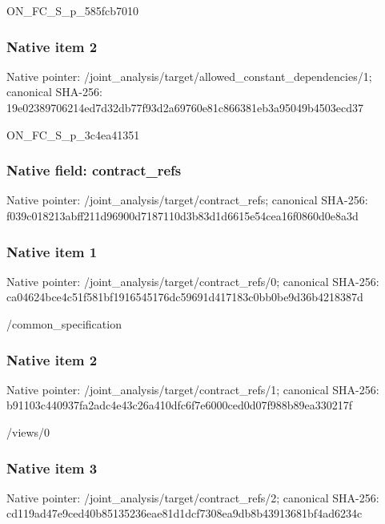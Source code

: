 \documentclass[10pt,a4paper]{article}
\begin{document}
\begingroup\raggedright\sloppy ON\_\allowbreak{}FC\_\allowbreak{}S\_\allowbreak{}p\_\allowbreak{}585fcb7010\par\endgroup

\subsubsection{Native item 2}
Native pointer: /joint\_\allowbreak{}analysis/target/allowed\_\allowbreak{}constant\_\allowbreak{}dependencies/1; canonical SHA-256: 19e02389706214ed7d32db77f93d2a69760e81c866381eb3a95049b4503ecd37

\begingroup\raggedright\sloppy ON\_\allowbreak{}FC\_\allowbreak{}S\_\allowbreak{}p\_\allowbreak{}3c4ea41351\par\endgroup

\subsubsection{Native field: contract\_\allowbreak{}refs}
Native pointer: /joint\_\allowbreak{}analysis/target/contract\_\allowbreak{}refs; canonical SHA-256: f039c018213abff211d96900d7187110d3b83d1d6615e54cea16f0860d0e8a3d

\subsubsection{Native item 1}
Native pointer: /joint\_\allowbreak{}analysis/target/contract\_\allowbreak{}refs/0; canonical SHA-256: ca04624bce4c51f581bf1916545176dc59691d417183c0bb0be9d36b4218387d

\begingroup\raggedright\sloppy /\allowbreak{}common\_\allowbreak{}specification\par\endgroup

\subsubsection{Native item 2}
Native pointer: /joint\_\allowbreak{}analysis/target/contract\_\allowbreak{}refs/1; canonical SHA-256: b91103c440937fa2adc4e43c26a410dfc6f7e6000ced0d07f988b89ea330217f

\begingroup\raggedright\sloppy /\allowbreak{}views/\allowbreak{}0\par\endgroup

\subsubsection{Native item 3}
Native pointer: /joint\_\allowbreak{}analysis/target/contract\_\allowbreak{}refs/2; canonical SHA-256: cd119ad47e9ced40b85135236eae81d1dcf7308ea9db8b43913681bf4ad6234c
\end{document}

